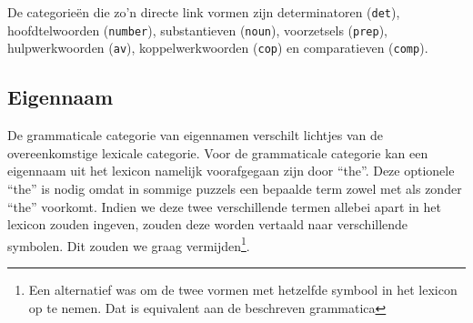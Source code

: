 
De categorieën die zo'n directe link vormen zijn determinatoren (\texttt{det}), hoofdtelwoorden (\texttt{number}), substantieven (\texttt{noun}), voorzetsels (\texttt{prep}), hulpwerkwoorden (\texttt{av}), koppelwerkwoorden (\texttt{cop}) en comparatieven (\texttt{comp}).


\subsection{Eigennaam}
De grammaticale categorie van eigennamen verschilt lichtjes van de overeenkomstige lexicale categorie. Voor de grammaticale categorie kan een eigennaam uit het lexicon namelijk voorafgegaan zijn door ``the''. Deze optionele ``the'' is nodig omdat in sommige puzzels een bepaalde term zowel met als zonder ``the'' voorkomt. Indien we deze twee verschillende termen allebei apart in het lexicon zouden ingeven, zouden deze worden vertaald naar verschillende symbolen. Dit zouden we graag vermijden\footnote{Een alternatief was om de twee vormen met hetzelfde symbool in het lexicon op te nemen. Dat is equivalent aan de beschreven grammatica}.


